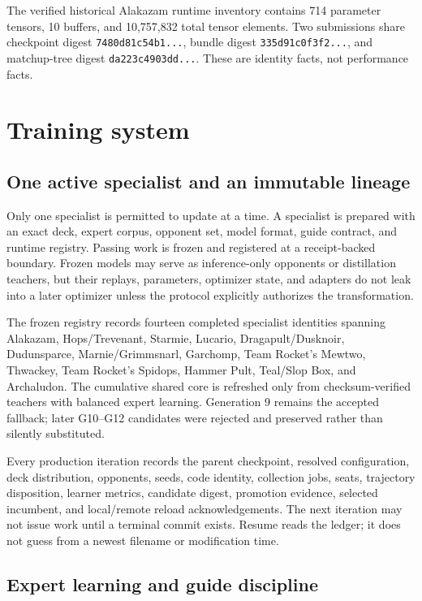 \documentclass[10pt]{article}
\begin{document}
The verified historical Alakazam runtime inventory contains 714 parameter tensors, 10 buffers, and 10,757,832 total tensor elements. Two submissions share checkpoint digest \texttt{7480d81c54b1...}, bundle digest \texttt{335d91c0f3f2...}, and matchup-tree digest \texttt{da223c4903dd...}. These are identity facts, not performance facts.

\section{Training system}

\subsection{One active specialist and an immutable lineage}

Only one specialist is permitted to update at a time. A specialist is prepared with an exact deck, expert corpus, opponent set, model format, guide contract, and runtime registry. Passing work is frozen and registered at a receipt-backed boundary. Frozen models may serve as inference-only opponents or distillation teachers, but their replays, parameters, optimizer state, and adapters do not leak into a later optimizer unless the protocol explicitly authorizes the transformation.

The frozen registry records fourteen completed specialist identities spanning Alakazam, Hops/Trevenant, Starmie, Lucario, Dragapult/Dusknoir, Dudunsparce, Marnie/Grimmsnarl, Garchomp, Team Rocket's Mewtwo, Thwackey, Team Rocket's Spidops, Hammer Pult, Teal/Slop Box, and Archaludon. The cumulative shared core is refreshed only from checksum-verified teachers with balanced expert learning. Generation 9 remains the accepted fallback; later G10--G12 candidates were rejected and preserved rather than silently substituted.

Every production iteration records the parent checkpoint, resolved configuration, deck distribution, opponents, seeds, code identity, collection jobs, seats, trajectory disposition, learner metrics, candidate digest, promotion evidence, selected incumbent, and local/remote reload acknowledgements. The next iteration may not issue work until a terminal commit exists. Resume reads the ledger; it does not guess from a newest filename or modification time.

\subsection{Expert learning and guide discipline}
\end{document}
